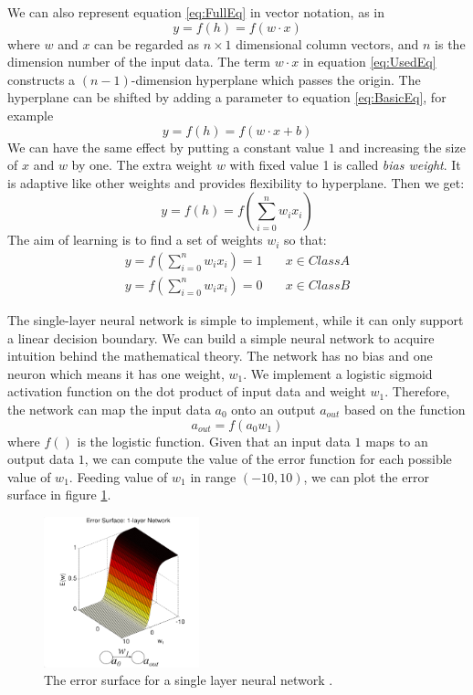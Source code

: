 We can also represent equation \ref{eq:FullEq} in vector notation, as in 
\begin{equation}\label{eq:UsedEq}
y = f(h) = f(w \cdot x)
\end{equation}
where $w$ and $x$ can be regarded as $n\times1$ dimensional column vectors, and $n$ is the dimension number of the input data.
The term $w \cdot x$ in equation \ref{eq:UsedEq} constructs a $(n-1)$-dimension hyperplane which passes the origin. The hyperplane can be shifted by adding a parameter to equation \ref{eq:BasicEq}, for example
\begin{equation}\label{eq:WithBias}
y = f(h) = f(w \cdot x + b)
\end{equation}
We can have the same effect by putting a constant value $1$ and increasing the size of $x$ and $w$ by one. The extra weight $w$ with fixed value 1 is called \textit{bias weight}. It is adaptive like other weights and provides flexibility to hyperplane. Then we get:
\begin{equation}\label{eq:finalEq}
y = f(h) = f(\sum_{i=0}^{n}w_{i}x_{i})
\end{equation}
The aim of learning is to find a set of weights $w_{i}$ so that:
\begin{align*}
y = f(\sum_{i=0}^{n}w_{i}x_{i}) = 1  & \quad x \in Class A\\
y = f(\sum_{i=0}^{n}w_{i}x_{i}) = 0  & \quad x \in Class B
\end{align*}

The single-layer neural network is simple to implement, while it can only support a linear decision boundary. We can build a simple neural network to acquire intuition behind the mathematical theory. The network has no bias and one neuron which means it has one weight, $w_{1}$. We implement a logistic sigmoid activation function on the dot product of input data and weight $w_{1}$. Therefore, the network can map the input data $a_0$ onto an output $a_{out}$ based on the function
\begin{equation}\label{eq:1LayerExample}
a_{out} = f(a_{0}w_{1})
\end{equation}
where $f()$ is the logistic function. Given that an input data $1$ maps to an output data $1$, we can compute the value of the error function for each possible value of $w_{1}$. Feeding value of $w_{1}$ in range $(-10,10)$, we can plot the error surface in figure \ref{fig:1LayerErrorSurface}.
\graphicspath{ {./Figures/} }
\begin{figure}[!htb]
\centering
\includegraphics[width=0.4\textwidth]{1LayerErrorSurface.png}
\caption{\label{fig:1LayerErrorSurface}The error surface for a single layer neural network \citep{ErrorFigure1}.}
\end{figure}

